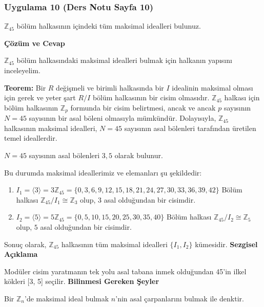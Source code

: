 \documentclass[11pt, a4paper]{article}
\newenvironment{cozum}{
    \vspace{0.5cm}
    \noindent\textcolor{green!60!black}{\faCheckCircle\enspace \textbf{\Large Çözüm ve Cevap}}\par\vspace{0.2cm}
}{}
\newenvironment{sezgisel}{
    \vspace{0.5cm}
    \noindent\textcolor{orange!80!black}{\faLightbulb\enspace \textbf{\Large Sezgisel Açıklama}}\par\vspace{0.2cm}
    \itshape
}{}
\newenvironment{bilgi}{
    \vspace{0.5cm}
    \noindent\textcolor{red!70!black}{\faExclamationTriangle\enspace \textbf{\Large Bilinmesi Gereken Şeyler}}\par\vspace{0.2cm}
}{}
\begin{document}
\newpage
\subsubsection{Uygulama 10 (Ders Notu Sayfa 10)}
\begin{sorubox}
$\mathbb{Z}_{45}$ bölüm halkasının içindeki tüm maksimal idealleri bulunuz.
\end{sorubox}
\begin{cozum}
$\mathbb{Z}_{45}$ bölüm halkasındaki maksimal idealleri bulmak için halkanın yapısını inceleyelim.

\textbf{Teorem:} Bir $R$ değişmeli ve birimli halkasında bir $I$ idealinin maksimal olması için gerek ve yeter şart $R/I$ bölüm halkasının bir cisim olmasıdır. $\mathbb{Z}_{45}$ halkası için bölüm halkasının $\mathbb{Z}_p$ formunda bir cisim belirtmesi, ancak ve ancak $p$ sayısının $N = 45$ sayısının bir asal böleni olmasıyla mümkündür. Dolayısıyla, $\mathbb{Z}_{45}$ halkasının maksimal idealleri, $N = 45$ sayısının asal bölenleri tarafından üretilen temel ideallerdir.

$N = 45$ sayısının asal bölenleri $3, 5$ olarak bulunur.

Bu durumda maksimal ideallerimiz ve elemanları şu şekildedir:
\begin{enumerate}
    \item $I_{1} = \langle 3 \rangle = 3\mathbb{Z}_{45} = \{0, 3, 6, 9, 12, 15, 18, 21, 24, 27, 30, 33, 36, 39, 42\}$
    Bölüm halkası $\mathbb{Z}_{45} / I_{1} \cong \mathbb{Z}_{3}$ olup, $3$ asal olduğundan bir cisimdir.
    \item $I_{2} = \langle 5 \rangle = 5\mathbb{Z}_{45} = \{0, 5, 10, 15, 20, 25, 30, 35, 40\}$
    Bölüm halkası $\mathbb{Z}_{45} / I_{2} \cong \mathbb{Z}_{5}$ olup, $5$ asal olduğundan bir cisimdir.
\end{enumerate}

Sonuç olarak, $\mathbb{Z}_{45}$ halkasının tüm maksimal idealleri $\{I_1, I_2\}$ kümesidir.
\end{cozum}
\begin{sezgisel}
Modüler cisim yaratmanın tek yolu asal tabana inmek olduğundan 45'in ilkel kökleri [3, 5] seçilir.
\end{sezgisel}
\begin{bilgi}
Bir $\mathbb{Z}_n$'de maksimal ideal bulmak $n$'nin asal çarpanlarını bulmak ile denktir.
\end{bilgi}

\newpage
\end{document}
